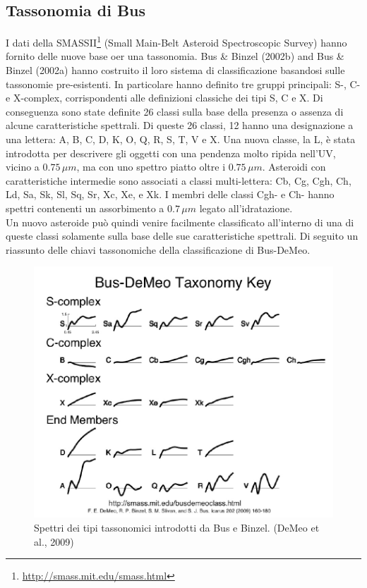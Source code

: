 \documentclass[a4paper,11pt,openright]{book}
\begin{document}
\subsection{Tassonomia di Bus}
I dati della SMASSII\footnote{\href{http://smass.mit.edu/smass.html}{http://smass.mit.edu/smass.html}} (Small Main-Belt Asteroid Spectroscopic Survey) hanno fornito delle nuove base oer una tassonomia. Bus \& Binzel (2002b) and Bus \& Binzel (2002a) hanno costruito il loro sistema di classificazione basandosi sulle tassonomie pre-esistenti. In particolare hanno definito tre gruppi principali: S-, C- e X-complex, corrispondenti alle definizioni classiche dei tipi S, C e X. Di conseguenza sono state definite 26 classi sulla base della presenza o assenza di alcune caratteristiche spettrali. Di queste 26 classi, 12 hanno una designazione a una lettera: A, B, C, D, K, O, Q, R, S, T, V e X. Una nuova classe, la L, è stata introdotta per descrivere gli oggetti con una pendenza molto ripida nell'UV, vicino a $0.75\,\mu m$, ma con uno spettro piatto oltre i $0.75\,\mu m$. Asteroidi con caratteristiche intermedie sono associati a classi multi-lettera: Cb, Cg, Cgh, Ch, Ld, Sa, Sk, Sl, Sq, Sr, Xc, Xe, e Xk. I membri delle classi Cgh- e Ch- hanno spettri contenenti un assorbimento a $0.7\,\mu m$ legato all'idratazione.\\
Un nuovo asteroide può quindi venire facilmente classificato all’interno di una di queste classi solamente sulla base delle sue caratteristiche spettrali. Di seguito un riassunto delle chiavi tassonomiche della classificazione di Bus-DeMeo.

\begin{figure}[h]
    \centering
    \includegraphics[scale=0.44]{figure/spettro_bus.jpg}
    \caption[Spettri dei tipi tassonomici introdotti da Bus e Binzel.]{Spettri dei tipi tassonomici introdotti da Bus e Binzel. (DeMeo et al., 2009)}
    \label{spettro_bus}
\end{figure}
\end{document}

